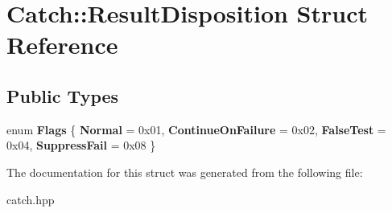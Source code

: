 \hypertarget{structCatch_1_1ResultDisposition}{}\section{Catch\+:\+:Result\+Disposition Struct Reference}
\label{structCatch_1_1ResultDisposition}
\subsection*{Public Types}
\begin{DoxyCompactItemize}
\item 
\mbox{\label{structCatch_1_1ResultDisposition_a3396cad6e2259af326b3aae93e23e9d8}} 
enum {\bfseries Flags} \{ {\bfseries Normal} = 0x01, 
{\bfseries Continue\+On\+Failure} = 0x02, 
{\bfseries False\+Test} = 0x04, 
{\bfseries Suppress\+Fail} = 0x08
 \}
\end{DoxyCompactItemize}


The documentation for this struct was generated from the following file\+:\begin{DoxyCompactItemize}
\item 
catch.\+hpp\end{DoxyCompactItemize}
